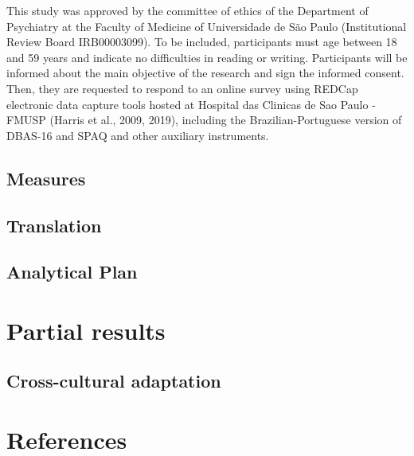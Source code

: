 \documentclass[
  ,doc,11pt, twoside,floatsintext]{apa6}
\begin{document}
This study was approved by the committee of ethics of the Department of Psychiatry at the Faculty of Medicine of Universidade de São Paulo (Institutional Review Board IRB00003099). To be included, participants must age between 18 and 59 years and indicate no difficulties in reading or writing. Participants will be informed about the main objective of the research and sign the informed consent. Then, they are requested to respond to an online survey using REDCap electronic data capture tools hosted at Hospital das Clinicas de Sao Paulo - FMUSP (Harris et al., 2009, 2019), including the Brazilian-Portuguese version of DBAS-16 and SPAQ and other auxiliary instruments.

\hypertarget{measures}{%
\subsection{Measures}\label{measures}}

\hypertarget{translation}{%
\subsection{Translation}\label{translation}}

\hypertarget{analytical-plan}{%
\subsection{Analytical Plan}\label{analytical-plan}}

\newpage

\hypertarget{partial-results}{%
\section{Partial results}\label{partial-results}}

\hypertarget{cross-cultural-adaptation}{%
\subsection{Cross-cultural adaptation}\label{cross-cultural-adaptation}}

\newpage

\hypertarget{references}{%
\section{References}\label{references}}

\setlength{\parindent}{-0.5in}
\setlength{\leftskip}{0.5in}
\end{document}
